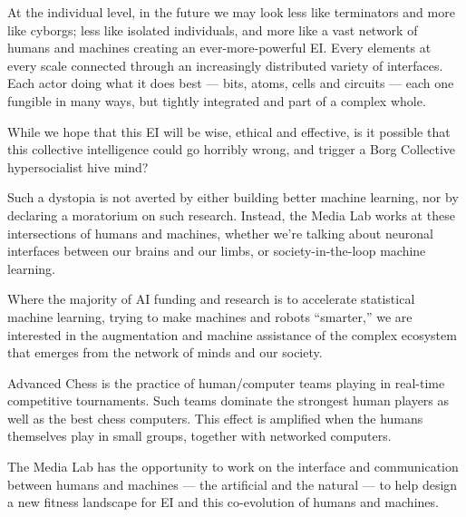 At the individual level, in the future we may look less like terminators and more like cyborgs; less like isolated individuals, and more like a vast network of humans and machines creating an ever-more-powerful \ac{EI}. Every elements at every scale connected through an increasingly distributed variety of interfaces. Each actor doing what it does best --- bits, atoms, cells and circuits --- each one fungible in many ways, but tightly integrated and part of a complex whole.

While we hope that this \ac{EI} will be wise, ethical and effective, is it possible that this collective intelligence could go horribly wrong, and trigger a Borg Collective hypersocialist hive mind?

Such a dystopia is not averted by either building better machine learning, nor by declaring a moratorium on such research. Instead, the Media Lab works at these intersections of humans and machines, whether we're talking about neuronal interfaces between our brains and our limbs, or society-in-the-loop machine learning.

Where the majority of \ac{AI} funding and research is to accelerate statistical machine learning, trying to make machines and robots ``smarter,'' we are interested in the augmentation and machine assistance of the complex ecosystem that emerges from the network of minds and our society.

Advanced Chess is the practice of human/computer teams playing in real-time competitive tournaments. Such teams dominate the strongest human players as well as the best chess computers. This effect is amplified when the humans themselves play in small groups, together with networked computers.

The Media Lab has the opportunity to work on the interface and communication between humans and machines --- the artificial and the natural --- to help design a new fitness landscape for \ac{EI} and this co-evolution of humans and machines.

